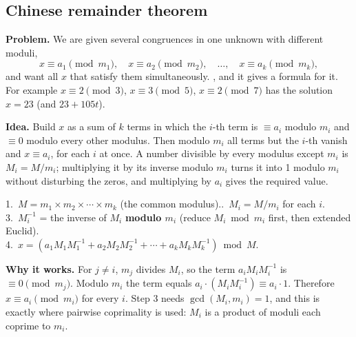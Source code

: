 \subsection{Chinese remainder theorem \hot}
\textbf{Problem.} We are given several congruences in one unknown with different moduli,
\[
x \equiv a_1 \pmod{m_1},\quad x \equiv a_2 \pmod{m_2},\quad \dots,\quad x \equiv a_k \pmod{m_k},
\]
and want all $x$ that satisfy them simultaneously. , and it gives a formula for it. For example $x \equiv 2 \pmod 3$, $x \equiv 3 \pmod 5$, $x \equiv 2 \pmod 7$ has the solution $x = 23$ (and $23 + 105t$).

\textbf{Idea.} Build $x$ as a sum of $k$ terms in which the $i$-th term is $\equiv a_i$ modulo $m_i$ and $\equiv 0$ modulo every other modulus. Then modulo $m_i$ all terms but the $i$-th vanish and $x \equiv a_i$, for each $i$ at once. A number divisible by every modulus except $m_i$ is $M_i = M / m_i$; multiplying it by its inverse modulo $m_i$ turns it into 1 modulo $m_i$ without disturbing the zeros, and multiplying by $a_i$ gives the required value.

\begin{mustknow}
1.\ $M = m_1 \times m_2 \times \cdots \times m_k$ (the common modulus)..\ $M_i = M / m_i$ for each $i$.\\
3.\ $M_i^{-1}$ = the inverse of $M_i$ \textbf{modulo $m_i$} (reduce $M_i \bmod m_i$ first, then extended Euclid).\\
4.\ $x = \left(a_1 M_1 M_1^{-1} + a_2 M_2 M_2^{-1} + \cdots + a_k M_k M_k^{-1}\right) \bmod M$.
\end{mustknow}

\textbf{Why it works.} For $j \ne i$, $m_j$ divides $M_i$, so the term $a_i M_i M_i^{-1}$ is $\equiv 0 \pmod{m_j}$. Modulo $m_i$ the term equals $a_i \cdot (M_i M_i^{-1}) \equiv a_i \cdot 1$. Therefore $x \equiv a_i \pmod{m_i}$ for every $i$. Step 3 needs $\gcd(M_i, m_i) = 1$, and this is exactly where pairwise coprimality is used: $M_i$ is a product of moduli each coprime to $m_i$.

